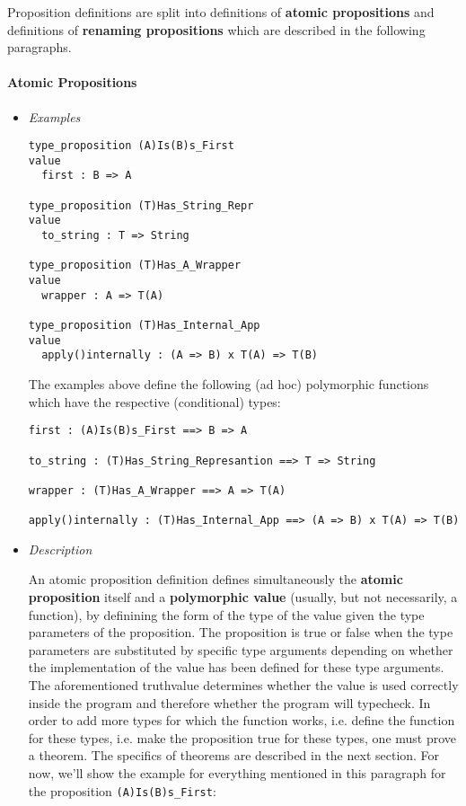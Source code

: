 \documentclass{article}
\begin{document}
Proposition definitions are split into definitions of \textbf{atomic
propositions} and definitions of \textbf{renaming propositions} which are
described in the following paragraphs.

\paragraph{Atomic Propositions}

\begin{itemize}
\item \textit{Examples}
\begin{verbatim}
type_proposition (A)Is(B)s_First
value
  first : B => A

type_proposition (T)Has_String_Repr
value
  to_string : T => String

type_proposition (T)Has_A_Wrapper
value
  wrapper : A => T(A)

type_proposition (T)Has_Internal_App
value
  apply()internally : (A => B) x T(A) => T(B)
\end{verbatim}
The examples above define the following (ad hoc) polymorphic functions which
have the respective (conditional) types:
\begin{verbatim}
first : (A)Is(B)s_First ==> B => A

to_string : (T)Has_String_Represantion ==> T => String

wrapper : (T)Has_A_Wrapper ==> A => T(A)

apply()internally : (T)Has_Internal_App ==> (A => B) x T(A) => T(B)
\end{verbatim}

\item \textit{Description}

An atomic proposition definition defines simultaneously the \textbf{atomic
proposition} itself and a \textbf{polymorphic value} (usually, but not
necessarily, a function), by definining the form of the type of the value given
the type parameters of the proposition. The proposition is true or false when
the type parameters are substituted by specific type arguments depending on
whether the implementation of the value has been defined for these type
arguments. The aforementioned truthvalue determines whether the value is used
correctly inside the program and therefore whether the program will typecheck.
In order to add more types for which the function works, i.e.  define the
function for these types, i.e. make the proposition true for these types, one
must prove a theorem. The specifics of theorems are described in the next
section. For now, we'll show the example for everything mentioned in this
paragraph for the proposition \texttt{(A)Is(B)s_First}:


\end{itemize}
\end{document}
